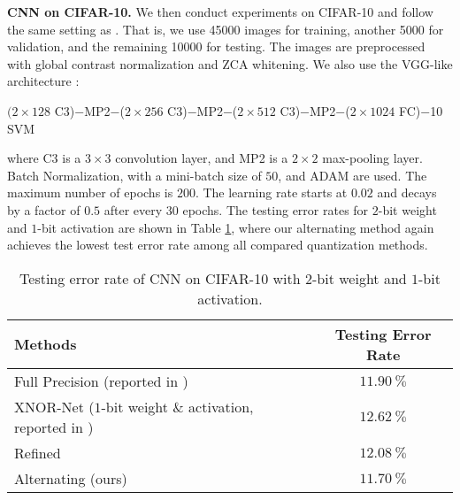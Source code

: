 \documentclass{article} %
\newcommand{\<}{\left\langle}
\renewcommand{\>}{\right\rangle}
\begin{document}
\textbf{CNN on CIFAR-10.} We then conduct experiments on CIFAR-10 and follow the same setting as \citep{lab}. That is, we use 45000 images for training, another 5000 for validation, and the remaining 10000 for testing. The images are preprocessed with global contrast normalization and ZCA whitening. We also use the VGG-like architecture \citep{vgg}:

$(2\times128$ C3)$-$MP2$-$($2\times256$ C3)$-$MP2$-$($2\times512$  C3)$-$MP2$-$($2\times1024$ FC)$-$10 SVM

where C3 is a $3\times3$ convolution layer, and MP2 is a $2\times2$ max-pooling layer. Batch Normalization, with a mini-batch size of $50$, and ADAM are used. The maximum number of epochs is $200$. The learning rate starts at $0.02$ and decays by a factor of $0.5$ after every $30$ epochs. The testing error rates for $2$-bit weight and $1$-bit activation are shown in Table \ref{cifar}, where our alternating method again achieves the lowest test error rate among all compared quantization methods. 

\begin{table}[!t]
	\caption{Testing error rate of CNN on CIFAR-10 with $2$-bit weight and $1$-bit activation.}
	\renewcommand{\arraystretch}{1.3}
	\label{cifar}
	\begin{center}
		\begin{tabular}{l c}
			\toprule[1.5pt]
			Methods &Testing Error Rate \\
			\hline
			Full Precision (reported in \citep{lab}) &   $11.90~\%$ \\
			\hline
			XNOR-Net ($1$-bit weight $\&$ activation, reported in \citep{lab}) \qquad &$12.62~\%$ \\	
			Refined \citep{refinedgreedy} \qquad\qquad\qquad  & $12.08~\%$  \\
			Alternating (ours)        &    $\mathbf{11.70~\%}$ \\
			\hline
		\end{tabular}
	\end{center}
\end{table}
\end{document}
